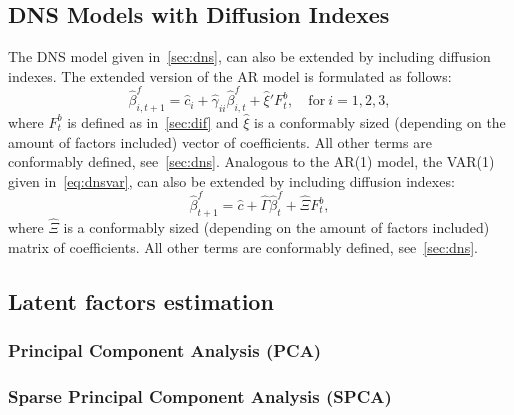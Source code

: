 \subsection{DNS Models with Diffusion Indexes}
\label{sec:dnsdif}
The DNS model given in~\cref{sec:dns}, can also be extended by including diffusion indexes. The extended version of the AR model is formulated as follows:
\begin{equation}
	\hat{\beta}_{i,t+1}^{f} = \hat{c}_i + \hat{\gamma}_{ii} \hat{\beta}_{i,t}^f + \hat{\xi}' F_t^b, \quad \text{for}~i = 1,2,3,
\end{equation}
where $F_t^b$ is defined as in~\cref{sec:dif} and $\hat{\xi}$ is a conformably sized (depending on the amount of factors included) vector of coefficients. All other terms are conformably defined, see~\cref{sec:dns}. Analogous to the AR(1) model, the VAR(1) given in~\cref{eq:dnsvar}, can also be extended by including diffusion indexes:
\begin{equation}
	\hat{\beta}_{t+1}^{f} = \hat{c} + \hat{\Gamma} \hat{\beta}_t^f + \hat{\Xi} F_t^b,
\end{equation}
where $\hat{\Xi}$ is a conformably sized (depending on the amount of factors included) matrix of coefficients. All other terms are conformably defined, see~\cref{sec:dns}.

\subsection{Latent factors estimation}
\label{sec:latentfactorestimation}
\subsubsection{Principal Component Analysis (PCA)}
\label{sec:pca}


\subsubsection{Sparse Principal Component Analysis (SPCA)}
\label{sec:spca}

